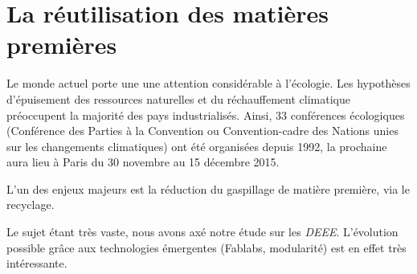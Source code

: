 \section{La réutilisation des matières premières}
Le monde actuel porte une une attention considérable à l'écologie. Les hypothèses d'épui\-sement des ressources naturelles et du réchauffement climatique préoccupent la majorité des pays industrialisés. Ainsi, 33 conférences écologiques (Conférence des Parties à la Convention ou Convention-cadre des Nations unies sur les changements climatiques) ont été organisées depuis 1992, la prochaine aura lieu à Paris du  30 novembre au 15 décembre 2015. 

L'un des enjeux majeurs est la réduction du gaspillage de matière première, via le recyclage. 

Le sujet étant très vaste, nous avons axé notre étude sur les \textit{DEEE}. L'évolution possible grâce aux technologies  émergentes (Fablabs, modularité) est en effet très intéressante. 